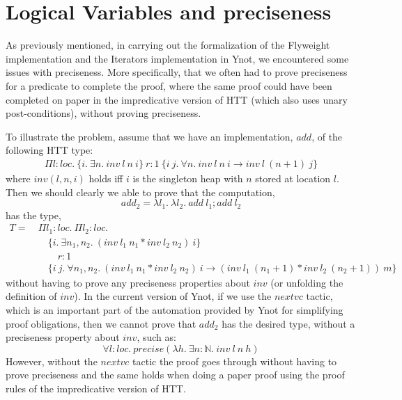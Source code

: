 \documentclass[a4paper,english]{article}
\newcommand{\N}[0]{\mathbb{N}}
\newcommand{\LOC}[0]{loc}
\begin{document}
\section{Logical Variables and preciseness}\label{logical-var}

As previously mentioned, in carrying out the formalization of the Flyweight
implementation and the Iterators implementation in Ynot, we encountered some
issues with preciseness. More specifically, that we often had to prove
preciseness for a predicate to complete the proof, where the same proof could
have been completed on paper in the impredicative version of HTT (which also
uses unary post-conditions), without proving preciseness.

To illustrate the problem, assume that we have an implementation, $add$, of the
following HTT type:
\begin{align*}
\Pi l : \LOC.\ \{ i.\ \exists n.\ inv\ l\ n\ i \}\ r : 1\ \{ i\ j.\ \forall n.\ inv\ l\ n\ i \rightarrow inv\ l\ (n+1)\ j \}
\end{align*}
where $inv(l, n, i)$ holds iff $i$ is the singleton heap with $n$ stored at
location $l$. Then we should clearly we able to prove that the computation,
$$add_2 = \lambda l_1.\ \lambda l_2.\ add\ l_1; add\ l_2$$
has the type,
\begin{align*}
T =\ &\Pi l_1 : \LOC.\ \Pi l_2 : \LOC.\\
&\quad\{ i.\ \exists n_1, n_2.\ (inv\ l_1\ n_1 * inv\ l_2\ n_2)\ i \}\\
&\quad\quad r : 1\\
&\quad\{ i\ j.\ \forall n_1, n_2.\ (inv\ l_1\ n_1 * inv\ l_2\ n_2)\ i \rightarrow (inv\ l_1\ (n_1+1) * inv\ l_2\ (n_2+1))\ m \}
\end{align*}
without having to prove any preciseness properties about $inv$ (or unfolding
the definition of $inv$). In the current version of Ynot, if we use the
$nextvc$ tactic, which is an important part of the automation provided by Ynot
for simplifying proof obligations, then we cannot prove that $add_2$ has the
desired type, without a preciseness property about $inv$, such as: $$\forall l
: \LOC.\ precise (\lambda h.\ \exists n : \N.\ inv\ l\ n\ h)$$ However, without
the $nextvc$ tactic the proof goes through without having to prove preciseness
and the same holds when doing a paper proof using the proof rules of the
impredicative version of HTT.
\end{document}
